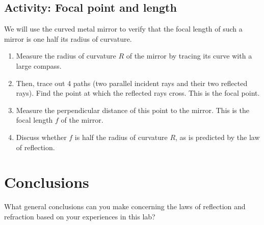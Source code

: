 \subsection{Activity: Focal point and length}
We will use the curved metal mirror to verify that the focal length of such a mirror is one half its radius of curvature.
\begin{enumerate}
	 \item Measure the radius of curvature $R$ of the mirror by tracing its curve with a large compass.  
	 \item Then, trace out 4 paths (two parallel incident rays and their two reflected rays). 
Find the point at which the reflected rays cross.
This is the focal point. 
	 \item Measure the perpendicular distance of this point 
to the mirror.  This is the focal length $f$ of the mirror.  
	 \item Discuss whether $f$ is half the radius of curvature $R$, as is predicted by the law of reflection.
\end{enumerate}
	
\section{Conclusions}
  What general conclusions can you make concerning the laws of reflection and refraction based on your experiences in this lab?
 
 
\endinput